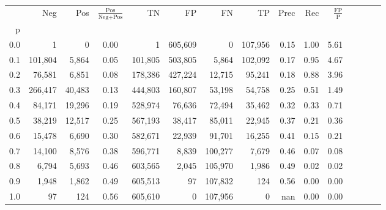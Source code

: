 \begin{tabular}{rrrcrrrrrrrrrrr}
\toprule
{} &      Neg &     Pos & $\frac{\text{Pos}}{\text{Neg}+\text{Pos}}$ &       TN &       FP &       FN &       TP &  Prec &   Rec & $\frac{\text{FP}}{\text{P}}$ \\
p   &          &         &                                            &          &          &          &          &       &       &                              \\
\midrule
0.0 &        1 &       0 &                                       0.00 &        1 &  605,609 &        0 &  107,956 &  0.15 &  1.00 &                         5.61 \\
0.1 &  101,804 &   5,864 &                                       0.05 &  101,805 &  503,805 &    5,864 &  102,092 &  0.17 &  0.95 &                         4.67 \\
0.2 &   76,581 &   6,851 &                                       0.08 &  178,386 &  427,224 &   12,715 &   95,241 &  0.18 &  0.88 &                         3.96 \\
0.3 &  266,417 &  40,483 &                                       0.13 &  444,803 &  160,807 &   53,198 &   54,758 &  0.25 &  0.51 &                         1.49 \\
0.4 &   84,171 &  19,296 &                                       0.19 &  528,974 &   76,636 &   72,494 &   35,462 &  0.32 &  0.33 &                         0.71 \\
0.5 &   38,219 &  12,517 &                                       0.25 &  567,193 &   38,417 &   85,011 &   22,945 &  0.37 &  0.21 &                         0.36 \\
0.6 &   15,478 &   6,690 &                                       0.30 &  582,671 &   22,939 &   91,701 &   16,255 &  0.41 &  0.15 &                         0.21 \\
0.7 &   14,100 &   8,576 &                                       0.38 &  596,771 &    8,839 &  100,277 &    7,679 &  0.46 &  0.07 &                         0.08 \\
0.8 &    6,794 &   5,693 &                                       0.46 &  603,565 &    2,045 &  105,970 &    1,986 &  0.49 &  0.02 &                         0.02 \\
0.9 &    1,948 &   1,862 &                                       0.49 &  605,513 &       97 &  107,832 &      124 &  0.56 &  0.00 &                         0.00 \\
1.0 &       97 &     124 &                                       0.56 &  605,610 &        0 &  107,956 &        0 &   nan &  0.00 &                         0.00 \\
\bottomrule
\end{tabular}
